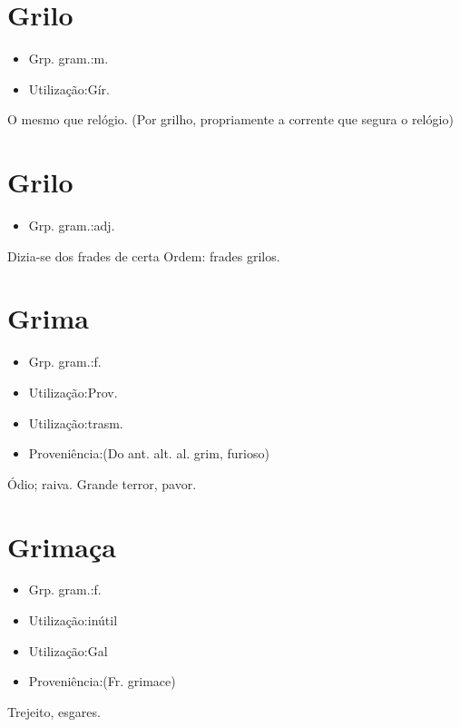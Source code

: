 \section{Grilo}
\begin{itemize}
\item {Grp. gram.:m.}
\end{itemize}
\begin{itemize}
\item {Utilização:Gír.}
\end{itemize}
O mesmo que \textunderscore relógio\textunderscore .
(Por \textunderscore grilho\textunderscore , propriamente a corrente que segura o relógio)
\section{Grilo}
\begin{itemize}
\item {Grp. gram.:adj.}
\end{itemize}
Dizia-se dos frades de certa Ordem: \textunderscore frades grilos\textunderscore .
\section{Grima}
\begin{itemize}
\item {Grp. gram.:f.}
\end{itemize}
\begin{itemize}
\item {Utilização:Prov.}
\end{itemize}
\begin{itemize}
\item {Utilização:trasm.}
\end{itemize}
\begin{itemize}
\item {Proveniência:(Do ant. alt. al. \textunderscore grim\textunderscore , furioso)}
\end{itemize}
Ódio; raiva.
Grande terror, pavor.
\section{Grimaça}
\begin{itemize}
\item {Grp. gram.:f.}
\end{itemize}
\begin{itemize}
\item {Utilização:inútil}
\end{itemize}
\begin{itemize}
\item {Utilização:Gal}
\end{itemize}
\begin{itemize}
\item {Proveniência:(Fr. \textunderscore grimace\textunderscore )}
\end{itemize}
Trejeito, esgares.
